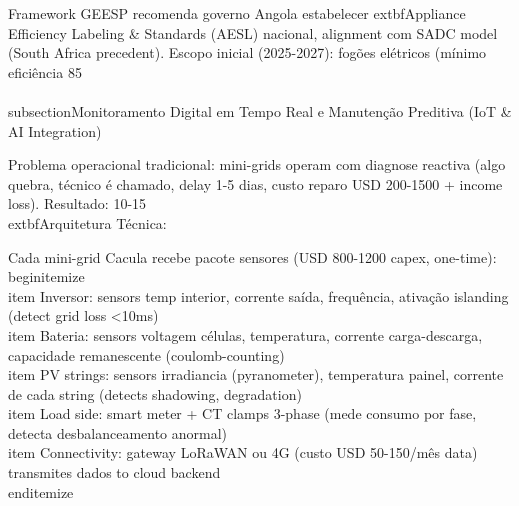 \documentclass[12pt, a4paper]{article}
\begin{document}
{{{{{{{{{{{{Framework GEESP recomenda governo Angola estabelecer 	extbf{Appliance Efficiency Labeling & Standards (AESL)} nacional, alignment com SADC model (South Africa precedent). Escopo inicial (2025-2027): fogões elétricos (mínimo eficiência 85\\%

\\subsection{Monitoramento Digital em Tempo Real e Manutenção Preditiva (IoT & AI Integration)}

Problema operacional tradicional: mini-grids operam com diagnose reactiva (algo quebra, técnico é chamado, delay 1-5 dias, custo reparo USD 200-1500 + income loss). Resultado: 10-15\\%

	extbf{Arquitetura Técnica:}

Cada mini-grid Cacula recebe pacote sensores (USD 800-1200 capex, one-time):
\\begin{itemize}
\\item Inversor: sensors temp interior, corrente saída, frequência, ativação islanding (detect grid loss <10ms)
\\item Bateria: sensors voltagem células, temperatura, corrente carga-descarga, capacidade remanescente (coulomb-counting)
\\item PV strings: sensors irradiancia (pyranometer), temperatura painel, corrente de cada string (detects shadowing, degradation)
\\item Load side: smart meter + CT clamps 3-phase (mede consumo por fase, detecta desbalanceamento anormal)
\\item Connectivity: gateway LoRaWAN ou 4G (custo USD 50-150/mês data) transmites dados to cloud backend
\\end{itemize}

}}}}}}}}}}}}
\end{document}
